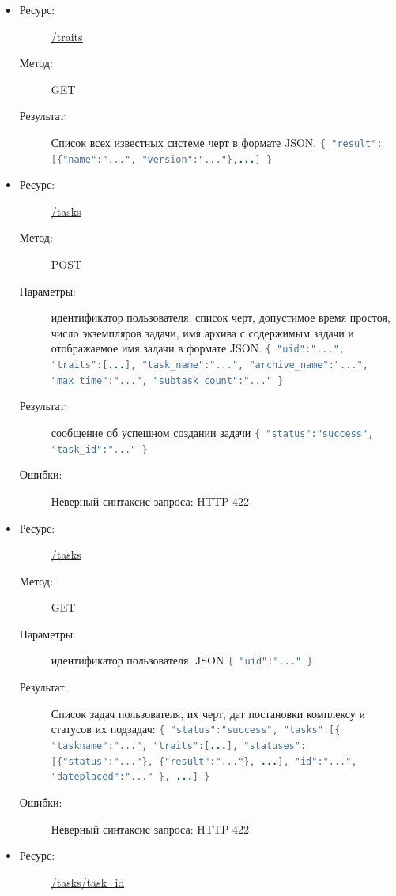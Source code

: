 \documentclass[a4paper,12pt]{report}
\numberwithin{equation}{section}
\begin{document}
  \begin{itemize}
    \item
    \begin{description}
      \item[Ресурс:] \url{/traits}
      \item[Метод:] GET
      \item[Результат:] Список всех известных системе черт в формате JSON. 
      \lstinline[language=Java]|{ "result":[{"name":"...", "version":"..."},...] }|
    \end{description}
    \item
    \begin{description}
      \item[Ресурс:] \url{/tasks}
      \item[Метод:] POST
      \item[Параметры:] идентификатор пользователя, список черт, допустимое время простоя, число экземпляров задачи, имя архива с содержимым задачи и отображаемое имя задачи в формате JSON.
      \lstinline[language=Java]|{ "uid":"...", "traits":[...], "task_name":"...", "archive_name":"...", "max_time":"...", "subtask_count":"..." }|
      \item[Результат:] сообщение об успешном создании задачи
      \lstinline[language=Java]|{ "status":"success", "task_id":"..." }|
      \item[Ошибки:] Неверный синтаксис запроса: HTTP 422
    \end{description}
    \item
    \begin{description}
      \item[Ресурс:] \url{/tasks}
      \item[Метод:] GET
      \item[Параметры:] идентификатор пользователя. JSON 
      \lstinline[language=Java]|{ "uid":"..." }|
      \item[Результат:] Список задач пользователя, их черт, дат постановки комплексу и статусов их подзадач:
      \lstinline[language=Java]|{ "status":"success", "tasks":[{ "taskname":"...", "traits":[...], "statuses":[{"status":"..."}, {"result":"..."}, ...], "id":"...", "dateplaced":"..." }, ...] }|
      \item[Ошибки:] Неверный синтаксис запроса: HTTP 422
    \end{description}
    \item
    \begin{description}
      \item[Ресурс:] \url{/tasks/task_id}

\end{description}
\end{itemize}
\end{document}
